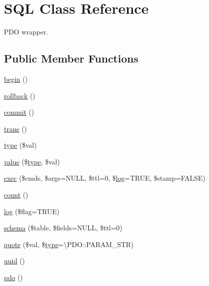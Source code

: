 \hypertarget{class_d_b_1_1_s_q_l}{}\section{S\+QL Class Reference}
\label{class_d_b_1_1_s_q_l}


P\+DO wrapper.  


\subsection*{Public Member Functions}
\begin{DoxyCompactItemize}
\item 
\hyperlink{class_d_b_1_1_s_q_l_a3a9793666e688407121d76d3a7e4db5d}{begin} ()
\item 
\hyperlink{class_d_b_1_1_s_q_l_afa549adf79e3f8c09fe8f903dd5fbfa7}{rollback} ()
\item 
\hyperlink{class_d_b_1_1_s_q_l_af5674c27d4a92f6228565010eacbb9cb}{commit} ()
\item 
\hyperlink{class_d_b_1_1_s_q_l_aeb7a9cfb4d43f94280b9c261ebb06148}{trans} ()
\item 
\hyperlink{class_d_b_1_1_s_q_l_a6fde55847377176e4f51ddd53705f269}{type} (\$val)
\item 
\hyperlink{class_d_b_1_1_s_q_l_a2f2c81ec59416b46db04db19ac4f8e1c}{value} (\$\hyperlink{class_d_b_1_1_s_q_l_a6fde55847377176e4f51ddd53705f269}{type}, \$val)
\item 
\hyperlink{class_d_b_1_1_s_q_l_a5fada1d189c38aeffb28fb712669309f}{exec} (\$cmds, \$args=N\+U\+LL, \$ttl=0, \$\hyperlink{class_d_b_1_1_s_q_l_a92faa80a7077936bd630e5dcc7bb4a64}{log}=T\+R\+UE, \$stamp=F\+A\+L\+SE)
\item 
\hyperlink{class_d_b_1_1_s_q_l_ac751e87b3d4c4bf2feb03bee8b092755}{count} ()
\item 
\hyperlink{class_d_b_1_1_s_q_l_a92faa80a7077936bd630e5dcc7bb4a64}{log} (\$flag=T\+R\+UE)
\item 
\hyperlink{class_d_b_1_1_s_q_l_ab0c9a209aa19a69b7c94e20bd6e536b1}{schema} (\$table, \$fields=N\+U\+LL, \$ttl=0)
\item 
\hyperlink{class_d_b_1_1_s_q_l_a719a37ee06136f9b4a4214632466bfb1}{quote} (\$val, \$\hyperlink{class_d_b_1_1_s_q_l_a6fde55847377176e4f51ddd53705f269}{type}=\textbackslash{}P\+D\+O\+::\+P\+A\+R\+A\+M\+\_\+\+S\+TR)
\item 
\hyperlink{class_d_b_1_1_s_q_l_a0a684acda95e124d8596758e4986fe44}{uuid} ()
\item 
\hyperlink{class_d_b_1_1_s_q_l_aa7612909f2506ecd3f2bc4ecbef3fe31}{pdo} ()

\end{DoxyCompactItemize}
